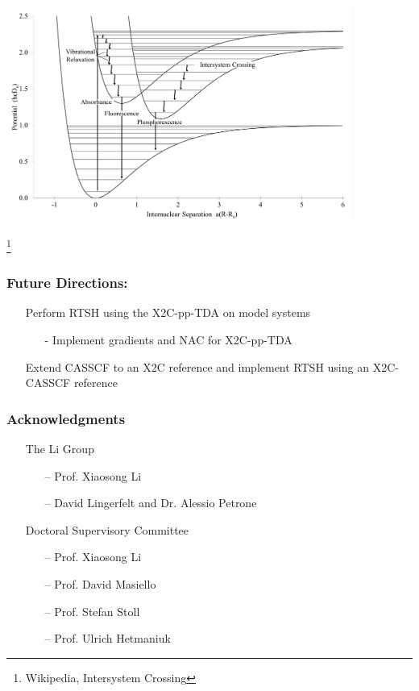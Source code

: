 \documentclass[usepdftitle=false,10pt]{beamer}
\newcommand\blfootnote[1]{%
  \begingroup
  \renewcommand\thefootnote{}\footnote{#1}%
  \addtocounter{footnote}{-1}%
  \endgroup
}
\begin{document}
\begin{frame}
  \frametitle{}
  \begin{center}
  \includegraphics[width=0.85\textwidth]{ISC} 
  \end{center}
  \vspace{-1cm}
  \blfootnote{\tiny Wikipedia, Intersystem Crossing}
\end{frame}
\begin{frame}
  \frametitle{Future Directions:}
  \begin{itemize}
    \item[\ding{228}] Perform RTSH using the X2C-pp-TDA on model systems
    \begin{itemize}
      \item[-] Implement gradients and NAC for X2C-pp-TDA
    \end{itemize}
    \item[\ding{228}] Extend CASSCF to an X2C reference and implement RTSH using an X2C-CASSCF reference
  \end{itemize}
  \vfill
\end{frame}

\begin{frame}
  \frametitle{Acknowledgments}
  \begin{itemize}
    \item[\ding{228}] The Li Group
    \begin{itemize}
      \item[--] Prof. Xiaosong Li
      \item[--] David Lingerfelt and Dr. Alessio Petrone
    \end{itemize}
    \item[\ding{228}] Doctoral Supervisory Committee
    \begin{itemize}
      \item[--] Prof. Xiaosong Li
      \item[--] Prof. David Masiello
      \item[--] Prof. Stefan Stoll
      \item[--] Prof. Ulrich Hetmaniuk
    \end{itemize}
  \end{itemize}
\end{frame}
\end{document}
